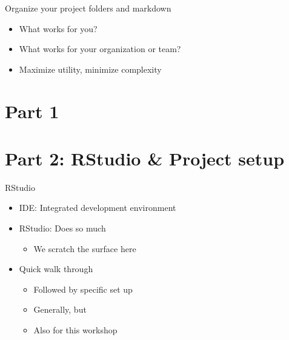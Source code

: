 \documentclass[
  ignorenonframetext,
]{beamer}
\providecommand{\tightlist}{%
  \setlength{\itemsep}{0pt}\setlength{\parskip}{0pt}}
\begin{document}
\begin{frame}{Organize your project folders and markdown}
\protect\hypertarget{organize-your-project-folders-and-markdown}{}

\begin{itemize}[<+->]
\tightlist
\item
  What works for you?
\item
  What works for your organization or team?
\item
  Maximize utility, minimize complexity
\end{itemize}

\end{frame}

\hypertarget{part-1}{%
\section{Part 1}\label{part-1}}

\hypertarget{part-2-rstudio-project-setup}{%
\section{Part 2: RStudio \& Project
setup}\label{part-2-rstudio-project-setup}}

\begin{frame}{RStudio}
\protect\hypertarget{rstudio}{}

\begin{itemize}[<+->]
\tightlist
\item
  IDE: Integrated development environment
\item
  RStudio: Does so much

  \begin{itemize}[<+->]
  \tightlist
  \item
    We scratch the surface here
  \end{itemize}
\item
  Quick walk through

  \begin{itemize}[<+->]
  \tightlist
  \item
    Followed by specific set up
  \item
    Generally, but
  \item
    Also for this workshop
  \end{itemize}
\end{itemize}

\end{frame}
\end{document}

